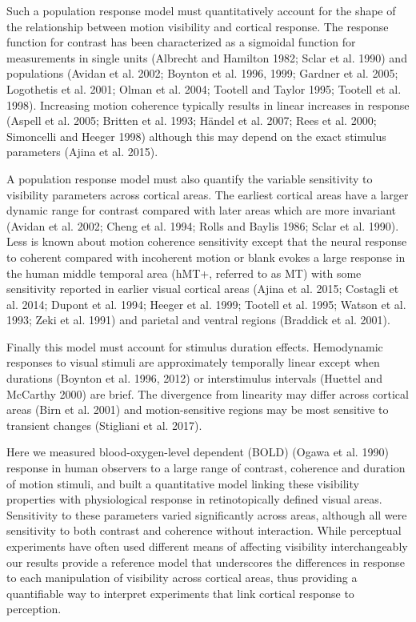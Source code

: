 \documentclass{report}
\begin{document}
Such a population response model must quantitatively account for the shape of the relationship between motion visibility and cortical response. The response function for contrast has been characterized as a sigmoidal function for measurements in single units (Albrecht and Hamilton 1982; Sclar et al. 1990) and populations (Avidan et al. 2002; Boynton et al. 1996, 1999; Gardner et al. 2005; Logothetis et al. 2001; Olman et al. 2004; Tootell and Taylor 1995; Tootell et al. 1998). Increasing motion coherence typically results in linear increases in response (Aspell et al. 2005; Britten et al. 1993; Händel et al. 2007; Rees et al. 2000; Simoncelli and Heeger 1998) although this may depend on the exact stimulus parameters (Ajina et al. 2015).

A population response model must also quantify the variable sensitivity to visibility parameters across cortical areas. The earliest cortical areas have a larger dynamic range for contrast compared with later areas which are more invariant (Avidan et al. 2002; Cheng et al. 1994; Rolls and Baylis 1986; Sclar et al. 1990). Less is known about motion coherence sensitivity except that the neural response to coherent compared with incoherent motion or blank evokes a large response in the human middle temporal area (hMT+, referred to as MT) with some sensitivity reported in earlier visual cortical areas (Ajina et al. 2015; Costagli et al. 2014; Dupont et al. 1994; Heeger et al. 1999; Tootell et al. 1995; Watson et al. 1993; Zeki et al. 1991) and parietal and ventral regions (Braddick et al. 2001).

Finally this model must account for stimulus duration effects. Hemodynamic responses to visual stimuli are approximately temporally linear except when durations (Boynton et al. 1996, 2012) or interstimulus intervals (Huettel and McCarthy 2000) are brief. The divergence from linearity may differ across cortical areas (Birn et al. 2001) and motion-sensitive regions may be most sensitive to transient changes (Stigliani et al. 2017).

Here we measured blood-oxygen-level dependent (BOLD) (Ogawa et al. 1990) response in human observers to a large range of contrast, coherence and duration of motion stimuli, and built a quantitative model linking these visibility properties with physiological response in retinotopically defined visual areas. Sensitivity to these parameters varied significantly across areas, although all were sensitivity to both contrast and coherence without interaction. While perceptual experiments have often used different means of affecting visibility interchangeably our results provide a reference model that underscores the differences in response to each manipulation of visibility across cortical areas, thus providing a quantifiable way to interpret experiments that link cortical response to perception.
\end{document}
